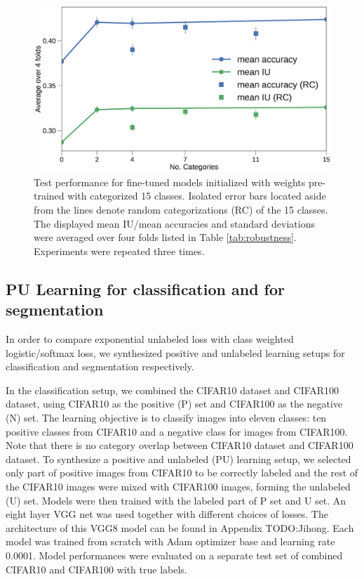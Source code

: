 \begin{figure}[t]
\centering
   \includegraphics[width=1.\linewidth]{img/num_classes.eps}
\caption{
Test performance for fine-tuned models initialized with weights pre-trained with categorized 15 classes.
Isolated error bars located aside from the lines denote random categorizations (RC) of the 15 classes.
The displayed mean IU/mean accuracies and standard deviations were averaged over four folds listed in Table \ref{tab:robustness}.
Experiments were repeated three times.
}
\label{fig:categories}
\end{figure}


\subsection{PU Learning for classification and for segmentation}
\label{subsec:pulearning}
\noindent
In order to compare exponential unlabeled loss with class weighted logistic/softmax loss, we synthesized positive and unlabeled learning setups for classification and segmentation respectively.

\noindent
In the classification setup, we combined the CIFAR10 dataset and CIFAR100 dataset, using CIFAR10 as the positive (P) set and CIFAR100 as the negative (N) set.
The learning objective is to classify images into eleven classes: ten positive classes from CIFAR10 and a negative class for images from CIFAR100.
Note that there is no category overlap between CIFAR10 dataset and CIFAR100 dataset.
To synthesize a positive and unlabeled (PU) learning setup, we selected only part of positive images from CIFAR10 to be correctly labeled and the rest of the CIFAR10 images were mixed with CIFAR100 images, forming the unlabeled (U) set.
Models were then trained with the labeled part of P set and U set.
An eight layer VGG net was used together with different choices of losses.
The architecture of this VGG8 model can be found in Appendix {TODO:Jihong}.
Each model was trained from scratch with Adam optimizer base and learning rate 0.0001.
Model performances were evaluated on a separate test set of combined CIFAR10 and CIFAR100 with true labels.


